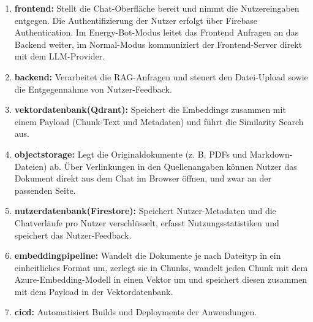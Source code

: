 \begin{enumerate}
    \item \textbf{\gls{frontend}:} Stellt die Chat-Oberfläche bereit und nimmt die Nutzereingaben entgegen. Die Authentifizierung der Nutzer erfolgt über Firebase Authentication. Im Energy-Bot-Modus leitet das Frontend Anfragen an das Backend weiter, im Normal-Modus kommuniziert der Frontend-Server direkt mit dem LLM-Provider.
    \item \textbf{\gls{backend}:} Verarbeitet die RAG-Anfragen und steuert den Datei-Upload sowie die Entgegennahme von Nutzer-Feedback.
    \item \textbf{\gls{vektordatenbank}{}(Qdrant):} Speichert die Embeddings zusammen mit einem Payload (Chunk-Text und Metadaten) und führt die Similarity Search aus.
    \item \textbf{\gls{objectstorage}:} Legt die Originaldokumente (z. B. PDFs und Markdown-Dateien) ab. Über Verlinkungen in den Quellenangaben können Nutzer das Dokument direkt aus dem Chat im Browser öffnen, und zwar an der passenden Seite.
    \item \textbf{\gls{nutzerdatenbank}{}(Firestore):}  Speichert Nutzer-Metadaten und die Chatverläufe pro Nutzer verschlüsselt, erfasst Nutzungsstatistiken und speichert das Nutzer-Feedback.
    \item \textbf{\gls{embeddingpipeline}:} Wandelt die Dokumente je nach Dateityp in ein einheitliches Format um, zerlegt sie in Chunks, wandelt jeden Chunk mit dem Azure-Embedding-Modell in einen Vektor um und speichert diesen zusammen mit dem Payload in der Vektordatenbank.
    \item \textbf{\gls{cicd}:} Automatisiert Builds und Deployments der Anwendungen.
\end{enumerate}

